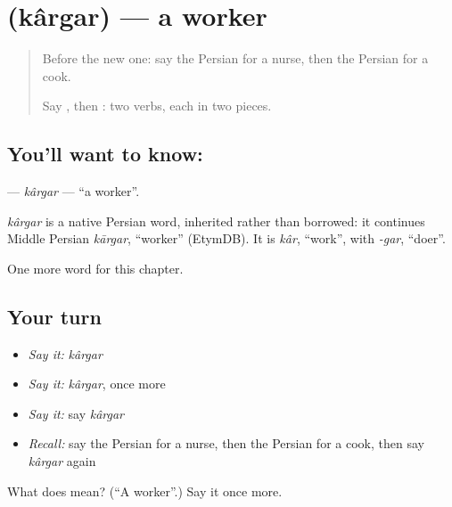 \section[\texorpdfstring{\fa{کارگر} (kârgar)}{کارگر (kârgar)}]{ (kârgar) — a worker}

\label{lesson:FA-C115-kargar}



\begin{quote}
Before the new one: say the Persian for a nurse, then the Persian for a cook.

Say \textbf{ }, then \textbf{ }: two verbs, each in two pieces.
\end{quote}

\subsection*{You'll want to know: }
\textbf{} — \emph{kârgar} — \textquotedblleft{}a worker\textquotedblright{}.

\begin{cousinweb}
\emph{kârgar} is a native Persian word, inherited rather than borrowed: it continues Middle Persian \emph{kārgar}, \textquotedblleft{}worker\textquotedblright{} (EtymDB). It is \emph{kâr}, \textquotedblleft{}work\textquotedblright{}, with \emph{-gar}, \textquotedblleft{}doer\textquotedblright{}.
\end{cousinweb}

\begin{grammarlens}[title={What you've built}]
One more word for this chapter.
\end{grammarlens}

\subsection*{Your turn}
\begin{itemize}
\raggedright
  \item \emph{Say it:} \emph{kârgar}
  \item \emph{Say it:} \emph{kârgar}, once more
  \item \emph{Say it:} say \emph{kârgar}
  \item \emph{Recall:} say the Persian for a nurse, then the Persian for a cook, then say \emph{kârgar} again
\end{itemize}

\begin{tcolorbox}[breakable,colback=teal!4,colframe=teal!35!black,title={Before you move on}]
What does  mean? (\textquotedblleft{}A worker\textquotedblright{}.) Say it once more.
\end{tcolorbox}
